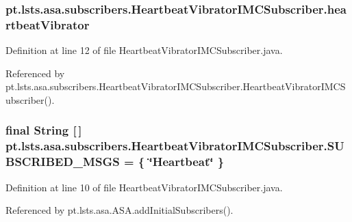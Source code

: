 \subsubsection[{heartbeat\+Vibrator}]{ pt.\+lsts.\+asa.\+subscribers.\+Heartbeat\+Vibrator\+I\+M\+C\+Subscriber.\+heartbeat\+Vibrator\hspace{0.3cm}{\ttfamily [private]}}\label{classpt_1_1lsts_1_1asa_1_1subscribers_1_1HeartbeatVibratorIMCSubscriber_a568d123e03e28a2e8ad4385d4227a743}


Definition at line 12 of file Heartbeat\+Vibrator\+I\+M\+C\+Subscriber.\+java.



Referenced by pt.\+lsts.\+asa.\+subscribers.\+Heartbeat\+Vibrator\+I\+M\+C\+Subscriber.\+Heartbeat\+Vibrator\+I\+M\+C\+Subscriber().

\hypertarget{classpt_1_1lsts_1_1asa_1_1subscribers_1_1HeartbeatVibratorIMCSubscriber_a9153056f3639306e0cd124d25db53247}{}
\subsubsection[{S\+U\+B\+S\+C\+R\+I\+B\+E\+D\+\_\+\+M\+S\+G\+S}]{\setlength{\rightskip}{0pt plus 5cm}final String \mbox{[}$\,$\mbox{]} pt.\+lsts.\+asa.\+subscribers.\+Heartbeat\+Vibrator\+I\+M\+C\+Subscriber.\+S\+U\+B\+S\+C\+R\+I\+B\+E\+D\+\_\+\+M\+S\+G\+S = \{ \char`\"{}Heartbeat\char`\"{} \}\hspace{0.3cm}{\ttfamily [static]}}\label{classpt_1_1lsts_1_1asa_1_1subscribers_1_1HeartbeatVibratorIMCSubscriber_a9153056f3639306e0cd124d25db53247}


Definition at line 10 of file Heartbeat\+Vibrator\+I\+M\+C\+Subscriber.\+java.



Referenced by pt.\+lsts.\+asa.\+A\+S\+A.\+add\+Initial\+Subscribers().

\hypertarget{classpt_1_1lsts_1_1asa_1_1subscribers_1_1HeartbeatVibratorIMCSubscriber_ae15a436e06007ae060a70852ed1b4ee4}{}
